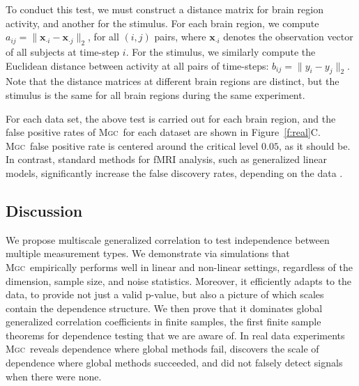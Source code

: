 \documentclass[11pt]{article}
\newcommand{\note}[2][]{\added[#1,remark={#2}]{}}
\providecommand{\sct}[1]{{\normalfont\textsc{#1}}}
\providecommand{\mb}[1]{\boldsymbol{#1}}
\newcommand{\Mgc}{\sct{Mgc}}
\newcommand{\jv}[1]{{\note{jv: #1}}}
\newcommand{\cs}[1]{{\note{cs: #1}}}
\newcommand{\mbx}{\ensuremath{\mb{x}}}
\begin{document}
To conduct this test, we must construct a distance matrix for brain region activity, and another for the stimulus. For each brain region, we compute $a_{ij}=\|\mbx_{\cdot i}-\mbx_{\cdot j}\|_2$, for all $(i,j)$ pairs,  where $\mbx_{\cdot i}$ denotes the observation vector of all subjects at time-step $i$.
For the stimulus, we similarly compute the Euclidean distance between activity at all pairs of time-steps: $b_{ij}= \|y_i - y_j\|_2$.
\cs{am i right?}
\jv{yes almost. But we don't need the square (otherwise it is distance squared) for a_{ij}, neither for b_{ij}.}
Note that the distance matrices at different brain regions are distinct, but the stimulus is the same for all brain regions during the same experiment.

For each data set, the above test is carried out for each brain region, and the false positive rates of \Mgc~for each dataset are shown in Figure~\ref{f:real}C. %
\Mgc~false positive rate is centered around the critical level $0.05$, as it should be.
In contrast,  standard methods for fMRI analysis, such as generalized linear models, significantly increase the false discovery rates, depending on the data \cite{EklundKnutsson2012,Eklund2015}.
\jv{you wrote "`significantly increase or decrease"', I delete the decrease part, because decreasing the FDR is actually a good thing, and in their paper they solely concentrate on FDR increase?!}

\subsection*{Discussion}
\label{conclu}

We propose multiscale generalized correlation to test independence between multiple measurement types.
We demonstrate via simulations that \Mgc~empirically performs well in linear and non-linear settings, regardless of the dimension, sample size, and noise statistics.  Moreover, it efficiently adapts to the data, to provide not just a valid p-value, but also a picture of which scales contain the dependence structure. We then prove that it dominates global generalized correlation coefficients in finite samples, the first finite sample theorems for dependence testing that we are aware of.  
In real data experiments \Mgc~reveals dependence where global methods fail, discovers the scale of dependence where global methods succeeded, and did not falsely detect signals when there were none.
\end{document}
